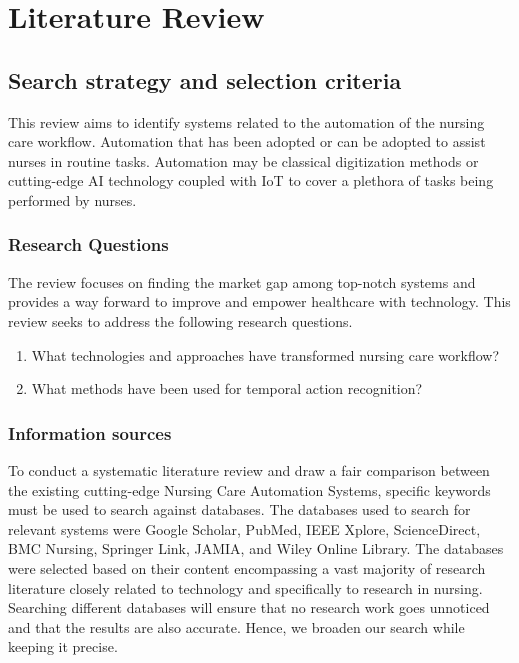 


\chapter{Literature Review} %
\label{Chapter2}
\section{Search strategy and selection criteria}
 This review aims to identify systems related to the automation of the nursing care workflow. Automation that has been adopted or can be adopted to assist nurses in routine tasks. Automation may be classical digitization methods or cutting-edge AI technology coupled with IoT to cover a plethora of tasks being performed by nurses.  
\subsection{Research Questions}
The review focuses on finding the market gap among top-notch systems and provides a way forward to improve and empower healthcare with technology. This review seeks to address the following research questions.
\begin{enumerate}
    \item What technologies and approaches have transformed nursing care workflow?
    \item What methods have been used for temporal action recognition?
\end{enumerate}
\subsection{Information sources}
To conduct a systematic literature review and draw a fair comparison between the existing cutting-edge Nursing Care Automation Systems, specific keywords must be used to search against databases. The databases used to search for relevant systems were Google Scholar, PubMed, IEEE Xplore, ScienceDirect, BMC Nursing, Springer Link, JAMIA, and Wiley Online Library. The databases were selected based on their content encompassing a vast majority of research literature closely related to technology and specifically to research in nursing. Searching different databases will ensure that no research work goes unnoticed and that the results are also accurate. Hence, we broaden our search while keeping it precise.
